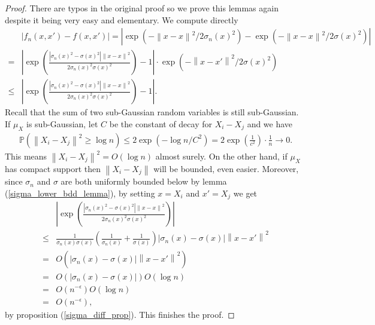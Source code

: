 \documentclass[10pt]{article}
\newcommand{\p}{\mathbb{P}}
\newcommand{\norm}[1]{\left\lVert#1\right\rVert}
\newenvironment{Proof of lemma}{\noindent{\bf Proof of Lemma}}{\hfill$\Box$\newline}
\newenvironment{Proof of claim}{\noindent{\bf Proof of claim}}{\hfill$\Box$\newline}
\newenvironment{Proof of theorem}{\noindent{\bf Proof of Theorem}}{\hfill\scriptsize{$\Box$}\newline}
\newenvironment{Proof of theorems}{\noindent{\bf Proof of Theorems}}{\hfill$\Box$\newline}
\newenvironment{Proof of proposition}{\noindent{\bf Proof of Proposition}}{\hfill$\Box$\newline}
\newenvironment{Proof of propositions}{\noindent{\bf Proof of Propositions}}{\hfill$\Box$\newline}
\newenvironment{Proof of exercise}{\noindent{\it Proof of Exercise:}}{\hfill$\Box$}
\numberwithin{equation}{section}
\begin{document}
\begin{proof}
    There are typos in the original proof so we prove this lemmas again despite it being very easy and elementary. We compute directly
    \begin{align}
             & |f_n(x,x')-f(x,x')| = |\exp(-\norm{x-x}^2/2\sigma_n(x)^2)-\exp(-\norm{x-x}^2/2\sigma(x)^2)| \nonumber                                                          \\
        =    & \left| \exp \left(\frac{|\sigma_n(x)^2-\sigma(x)^2|\norm{x-x}^2}{2\sigma_n(x)^2 \sigma(x)^2}\right)-1\right| \cdot \exp(-\norm{x-x'}^2/2\sigma(x)^2) \nonumber \\
        \leq & \left| \exp \left(\frac{|\sigma_n(x)^2-\sigma(x)^2|\norm{x-x}^2}{2\sigma_n(x)^2 \sigma(x)^2}\right)-1\right|.
    \end{align}
    Recall that the sum of two sub-Gaussian random variables is still sub-Gaussian. If $\mu_X$ is sub-Gaussian, let $C$ be the constant of decay for $X_i-X_j$ and we have
    \begin{align} \label{distance_esti}
        \p(\norm{X_i-X_j}^2 \geq \log n) \leq 2 \exp(-\log n /C^2) = 2 \exp\left(\frac{1}{c^2}\right) \cdot \frac{1}{n} \to 0.
    \end{align}
    This means $\norm{X_i-X_j}^2 = O(\log n)$ almost surely. On the other hand, if $\mu_X$ has compact support then $\norm{X_i-X_j}$ will be bounded, even easier. Moreover, since $\sigma_n$ and $\sigma$ are both uniformly bounded below by lemma (\ref{sigma_lower_bdd_lemma}), by setting $x=X_i$ and $x'=X_j$ we get
    \begin{align}
             & \left| \exp \left(\frac{|\sigma_n(x)^2-\sigma(x)^2|\norm{x-x}^2}{2\sigma_n(x)^2 \sigma(x)^2}\right)\right| \nonumber                  \\
        \leq & \frac{1}{\sigma_n(x) \sigma(x)}\left(\frac{1}{\sigma_n(x)} + \frac{1}{\sigma(x)}\right)|\sigma_n(x)-\sigma(x)|\norm{x-x'}^2 \nonumber \\
        =    & O(|\sigma_n(x)-\sigma(x)|\norm{x-x'}^2) \nonumber                                                                                     \\
        =    & O(|\sigma_n(x)-\sigma(x)|)O(\log n) \nonumber                                                                                         \\
        =    & O(n^{-\epsilon})O(\log n) \nonumber                                                                                                   \\
        =    & O(n^{-\epsilon}),
    \end{align}
    by proposition (\ref{sigma_diff_prop}). This finishes the proof.
\end{proof}
\end{document}
